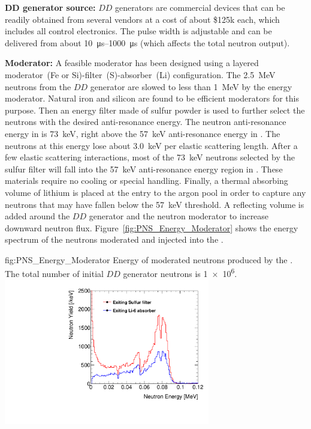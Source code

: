 {\bf DD generator source:} $DD$ generators are commercial devices that can be readily obtained from several vendors at a cost of about \$\num{125}k each, which includes all control electronics. The pulse width is adjustable and can be delivered from about \SIrange{10}{1000}{\micro\s} (which affects the total neutron output). 

{\bf Moderator:}  A feasible moderator has been designed using a layered moderator~(Fe or Si)-filter~(S)-absorber~(Li) %
configuration. The \SI{2.5}{\MeV} neutrons from the $DD$ generator are slowed to less than \SI{1}{\MeV} by the energy moderator. Natural iron and silicon are found to be efficient moderators for this purpose. Then an energy filter made of sulfur powder is used to further select the neutrons with the desired anti-resonance energy.
The neutron anti-resonance energy in  is \SI{73}{\keV}, right above the \SI{57}{\keV} anti-resonance energy in . The neutrons at this energy lose about \SI{3.0}{\keV} per elastic scattering length. After a few elastic scattering interactions, most of the \SI{73}{\keV} neutrons selected by the sulfur filter will fall into the \SI{57}{\keV} anti-resonance energy region in . These materials require no cooling or special handling. Finally, a thermal absorbing volume of lithium is placed at the entry to the argon pool in order to capture any neutrons that may have fallen below the \SI{57}{\keV} threshold. A reflecting volume is added around the $DD$ generator and the neutron moderator to increase downward neutron flux. Figure~\ref{fig:PNS_Energy_Moderator} shows the energy spectrum of the neutrons moderated and injected into the .


\begin{dunefigure}{fig:PNS_Energy_Moderator}
{Energy of moderated neutrons produced by the . %
The total number of initial $DD$ generator neutrons is \num{1e6}.}
\includegraphics[width=9cm]{graphics/PNS_Energy_Moderator.pdf}
\end{dunefigure}

